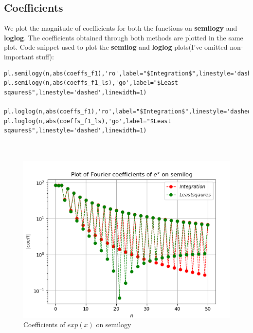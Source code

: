 \documentclass[11pt, a4paper]{article}
\begin{document}
    \subsection{Coefficients}
    We plot the magnitude of coefficients for both the functions on \textbf{semilogy} and \textbf{loglog}. The coefficients obtained through both methods are plotted in the same plot. Code snippet used to plot the \textbf{semilog} and \textbf{loglog} plots(I've omitted non-important stuff):
    \begin{verbatim}
pl.semilogy(n,abs(coeffs_f1),'ro',label="$Integration$",linestyle='dashed',linewidth=1)
pl.semilogy(n,abs(coeffs_f1_ls),'go',label="$Least sqaures$",linestyle='dashed',linewidth=1)

pl.loglog(n,abs(coeffs_f1),'ro',label="$Integration$",linestyle='dashed',linewidth=1)
pl.loglog(n,abs(coeffs_f1_ls),'go',label="$Least sqaures$",linestyle='dashed',linewidth=1)

    
    \end{verbatim}
    \begin{figure}[!h]
        \centering
        \includegraphics[scale = 0.8]{Figure 3.png}
        \caption{Coefficients of $exp(x)$ on semilogy}
        \label{fig:Figure 3}
    \end{figure}
\end{document}
